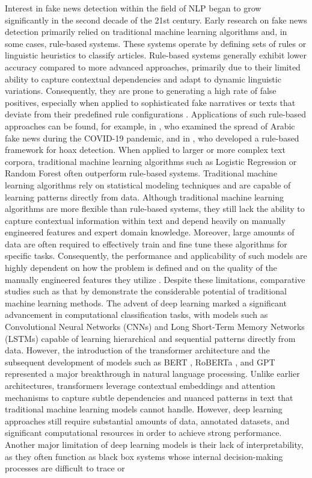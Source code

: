 \documentclass[12pt,a4paper,twocolumn]{article}
\begin{document}
Interest in fake news detection within the field of NLP began to grow significantly in the second decade of the 21st century. Early research on fake news detection primarily relied on traditional machine learning algorithms and, in some cases, rule-based systems. These systems operate by defining sets of rules or linguistic heuristics to classify articles. Rule-based systems generally exhibit lower accuracy compared to more advanced approaches, primarily due to their limited ability to capture contextual dependencies and adapt to dynamic linguistic variations. Consequently, they are prone to generating a high rate of false positives, especially when applied to sophisticated fake narratives or texts that deviate from their predefined rule configurations \citep{polu2024ai, repede2023comparison}. Applications of such rule-based approaches can be found, for example, in \citet{alotaibi2022rule}, who examined the spread of Arabic fake news during the COVID-19 pandemic, and in \citet{yuliani2019framework}, who developed a rule-based framework for hoax detection. When applied to larger or more complex text corpora, traditional machine learning algorithms such as Logistic Regression or Random Forest often outperform rule-based systems. Traditional machine learning algorithms rely on statistical modeling techniques and are capable of learning patterns directly from data. Although traditional machine learning algorithms are more flexible than rule-based systems, they still lack the ability to capture contextual information within text and depend heavily on manually engineered features and expert domain knowledge. Moreover, large amounts of data are often required to effectively train and fine tune these algorithms for specific tasks. Consequently, the performance and applicability of such models are highly dependent on how the problem is defined and on the quality of the manually engineered features they utilize \citep{polu2024ai, pittman2025truthtextmetaanalysismlbased}. Despite these limitations, comparative studies such as that by \citet{Sudhakar2022Prediction} demonstrate the considerable potential of traditional machine learning methods. The advent of deep learning marked a significant advancement in computational classification tasks, with models such as Convolutional Neural Networks (CNNs) and Long Short-Term Memory Networks (LSTMs) capable of learning hierarchical and sequential patterns directly from data. However, the introduction of the transformer architecture and the subsequent development of models such as BERT \citep{devlin-etal-2019-bert}, RoBERTa \citep{liu2019robertarobustlyoptimizedbert}, and GPT \citep{radford2018improving} represented a major breakthrough in natural language processing. Unlike earlier architectures, transformers leverage contextual embeddings and attention mechanisms to capture subtle dependencies and nuanced patterns in text that traditional machine learning models cannot handle. However, deep learning approaches still require substantial amounts of data, annotated datasets, and significant computational resources in order to achieve strong performance. Another major limitation of deep learning models is their lack of interpretability, as they often function as black box systems whose internal decision-making processes are difficult to trace or 
\end{document}
